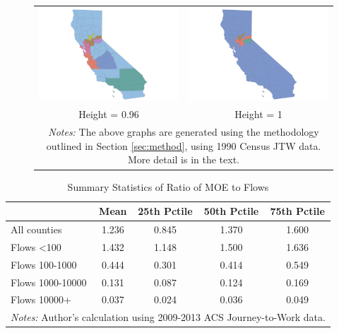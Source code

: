 \begin{figure}[th]
\begin{tabular}{cc}
\includegraphics[scale=0.1]{./figures/insetmaps/california_clustermap_960_inset6.png} & \includegraphics[scale=0.1]{./figures/insetmaps/california_clustermap_1000_inset6.png} \\
Height = 0.96 & Height = 1\\
\multicolumn{2}{p{5in}}{\footnotesize \emph{Notes:} The above graphs are generated using the methodology outlined in Section \ref{sec:method}, using 1990 Census JTW data. More detail is in the text.}
\end{tabular}
\end{figure}

\begin{table}[h]
\caption{Summary Statistics of Ratio of MOE to Flows \label{tab:moesum}}
\begin{tabular}{lcccc}
\hline\hline
& Mean & 25th Pctile & 50th Pctile & 75th Pctile \\
\hline
All counties & 1.236 & 0.845 & 1.370 & 1.600\\
Flows <100 & 1.432 & 1.148 & 1.500 & 1.636 \\
Flows 100-1000 & 0.444 & 0.301 & 0.414 & 0.549  \\
Flows 1000-10000 & 0.131 & 0.087 & 0.124 & 0.169 \\
Flows 10000+ & 0.037 & 0.024 & 0.036 & 0.049 \\
\hline\hline
\multicolumn{5}{p{4in}}{\footnotesize \emph{Notes:} Author's calculation using
2009-2013 ACS Journey-to-Work data.}
\end{tabular}
\end{table}
